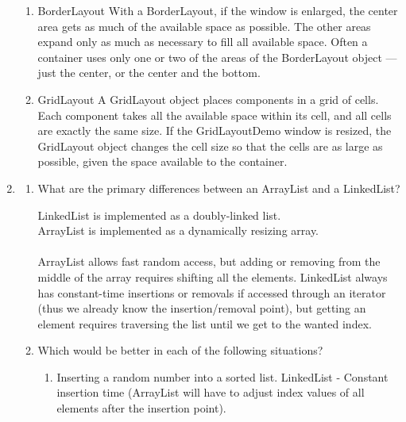 \documentclass[11pt]{article}
\newenvironment{answer}{\large\lstset{basicstyle=\tiny\ttfamily}\color{white} }{}
\newenvironment{answer}{\large\lstset{basicstyle=\large\ttfamily}\color{red} }{}
\begin{document}
\begin{enumerate}
\begin{enumerate}
\item BorderLayout
\begin{answer}
With a BorderLayout, if the window is enlarged, the center area gets as much of the available space as possible. The other areas expand only as much as necessary to fill all available space. Often a container uses only one or two of the areas of the BorderLayout object — just the center, or the center and the bottom. \end{answer}

\item GridLayout
\begin{answer}
A GridLayout object places components in a grid of cells. Each component takes all the available space within its cell, and all cells are exactly the same size. If the GridLayoutDemo window is resized, the GridLayout object changes the cell size so that the cells are as large as possible, given the space available to the container.\end{answer}
\end{enumerate}




\item
\begin{enumerate}
	\item What are the primary differences between an ArrayList and a LinkedList?
	
	\begin{answer}
	LinkedList is implemented as a doubly-linked list.
	\\ArrayList is implemented as a dynamically resizing array.
	\\ \\ArrayList allows fast random access, but adding or removing from the middle of the array
	requires shifting all the elements. LinkedList always has constant-time insertions or removals
	if accessed through an iterator (thus we already know the insertion/removal point), but getting
	an element requires traversing the list until we get to the wanted index.
	
	\end{answer}
	
	\item Which would be better in each of the following situations?
	\begin{enumerate}
		\item Inserting a random number into a sorted list.
		\begin{answer}
		LinkedList - Constant insertion time (ArrayList will have to adjust index values of all elements after the insertion point).
		\end{answer}
		

\end{enumerate}
\end{enumerate}
\end{enumerate}
\end{document}

